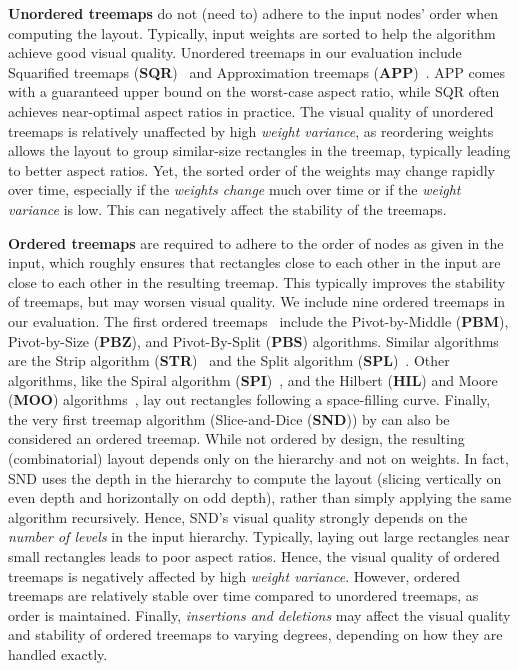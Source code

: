 \smallskip\noindent
\textbf{Unordered treemaps} do not (need to) adhere to the input nodes' order when computing the layout. Typically, input weights are sorted to help the algorithm achieve good visual quality. Unordered treemaps in our evaluation include Squarified treemaps (\textbf{SQR})~\citep{sqr} and Approximation treemaps (\textbf{APP})~\citep{nagamochi07}. APP comes with a guaranteed upper bound on the worst-case aspect ratio, while SQR often achieves near-optimal aspect ratios in practice.
%
The visual quality of unordered treemaps is relatively unaffected by high \emph{weight variance}, as reordering weights allows the layout to group similar-size rectangles in the treemap, typically leading to better aspect ratios. Yet, the sorted order of the weights may change rapidly over time, especially if the \emph{weights change} much over time or if the \emph{weight variance} is low. This can negatively affect the stability of the treemaps. 

\smallskip\noindent
\textbf{Ordered treemaps} are required to adhere to the order of nodes as given in the input, which roughly ensures that rectangles close to each other in the input are close to each other in the resulting treemap. This typically improves the stability of treemaps, but may worsen visual quality. We include nine ordered treemaps in our evaluation. The first ordered treemaps~\citep{ordered} include the Pivot-by-Middle (\textbf{PBM}), Pivot-by-Size (\textbf{PBZ}), and Pivot-By-Split (\textbf{PBS}) algorithms. Similar algorithms are the Strip algorithm (\textbf{STR})~\citep{bederson02} and the Split algorithm (\textbf{SPL})~\citep{engdahl}. Other algorithms, like the Spiral algorithm (\textbf{SPI})~\citep{spiral}, and the Hilbert (\textbf{HIL}) and Moore (\textbf{MOO}) algorithms~\citep{hilbert_moore}, lay out rectangles following a space-filling curve. Finally, the very first treemap algorithm (Slice-and-Dice (\textbf{SND})) by \cite{shneiderman92} can also be considered an ordered treemap. While not ordered by design, the resulting (combinatorial) layout depends only on the hierarchy and not on weights. In fact, SND uses the depth in the hierarchy to compute the layout (slicing vertically on even depth and horizontally on odd depth), rather than simply applying the same algorithm recursively. Hence, SND's visual quality strongly depends on the \emph{number of levels} in the input hierarchy. 
%
Typically, laying out large rectangles near small rectangles leads to poor aspect ratios. Hence, the visual quality of ordered treemaps is negatively affected by high \emph{weight variance}. However, ordered treemaps are relatively stable over time compared to unordered treemaps, as order is maintained. Finally, \emph{insertions and deletions} may affect the visual quality and stability of ordered treemaps to varying degrees, depending on how they are handled exactly.

